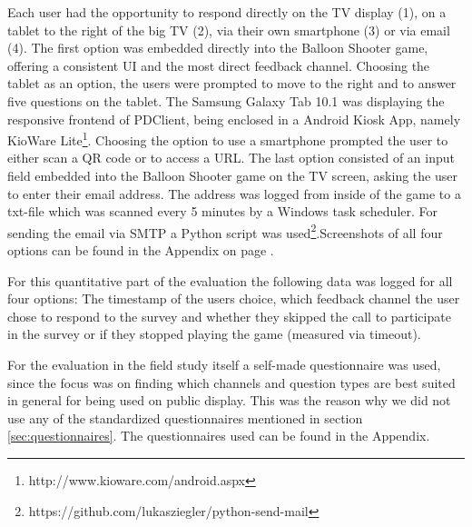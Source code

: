		Each user had the opportunity to respond directly on the TV display (1), on a tablet to the right of the big TV (2), via their own smartphone (3) or via email (4). The first option was embedded directly into the Balloon Shooter game, offering a consistent UI and the most direct feedback channel. Choosing the tablet as an option, the users were prompted to move to the right and to answer five questions on the tablet. The Samsung Galaxy Tab 10.1 was displaying the responsive frontend of PDClient, being enclosed in a Android Kiosk App, namely KioWare Lite\footnote{http://www.kioware.com/android.aspx}. Choosing the option to use a smartphone prompted the user to either scan a QR code or to access a URL. The last option consisted of an input field embedded into the Balloon Shooter game on the TV screen, asking the user to enter their email address. The address was logged from inside of the game to a txt-file which was scanned every 5 minutes by a Windows task scheduler. For sending the email via SMTP a Python script was used\footnote{https://github.com/lukasziegler/python-send-mail}.Screenshots of all four options can be found in the Appendix on page \pageref{appendix:screenshots-balloon-shooter}.

		For this quantitative part of the evaluation the following data was logged for all four options: The timestamp of the users choice, which feedback channel the user chose to respond to the survey and whether they skipped the call to participate in the survey or if they stopped playing the game (measured via timeout). 




		For the evaluation in the field study itself a self-made questionnaire was used, since the focus was on finding which channels and question types are best suited in general for being used on public display. This was the reason why we did not use any of the standardized questionnaires mentioned in section \ref{sec:questionnaires}. The questionnaires used can be found in the Appendix.


